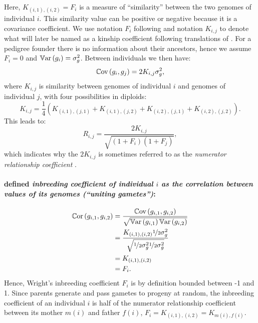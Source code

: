 %
Here, $K_{(i,1),(i,2)} = F_i$ is a measure of ``similarity'' between the
two genomes of individual $i$.
%
This similarity value can be positive or negative because it is a covariance
coefficient.
%
We use notation $F_i$ following \cite{wright1922coefficients} and
notation $K_{i,j}$ to denote what will later be named as a kinship
coefficient following translations of
\cite{malecot1948mathematiques, malecot1969mathemathics}.
%
For a pedigree founder there is no information about their ancestors,
hence we assume $F_i=0$ and $\mathbb{V}\text{ar}\left(g_i\right) = \sigma_g^2$.
%
Between individuals we then have:
%
\begin{equation} \label{eqn:g_pair_cov}
  \mathbb{C}\text{ov}\left(g_i, g_j\right)=2K_{i,j}\sigma_g^2,
\end{equation}
%
where $K_{i,j}$ is similarity between genomes of individual $i$ and
genomes of individual $j$, with four possibilities in diploids:
%
\begin{equation}
  K_{i,j} = \frac{1}{4}\left(
    K_{(i,1), (j,1)} +
    K_{(i,1), (j,2)} +
    K_{(i,2), (j,1)} +
    K_{(i,2), (j,2)}\right).\label{eqn:kinship_pair}
\end{equation}
%
This leads to:
%
\begin{equation}
  R_{i,j} = \frac{2K_{i,j}}
                 {\sqrt{\left(1 + F_i\right)\left(1 + F_j\right)}},
  \label{eqn:wright_relationship_K}
\end{equation}
%
which indicates why the $2K_{i,j}$ is sometimes referred to as
the \textit{numerator relationship coefficient} \citep{henderson1976simple}.

\paragraph{\cite{wright1922coefficients} defined
\textit{inbreeding coefficient of individual $i$ as the correlation
between values of its genomes (``uniting gametes'')}:}
%
\begin{align} \label{eqn:wright_inbreeding}
  \mathbb{C}\text{or}\left(g_{i,1}, g_{i,2}\right) & = \frac{\mathbb{C}\text{ov}\left(g_{i,1}, g_{i,2}\right)}
                                             {\sqrt{\mathbb{V}\text{ar}\left(g_{i,1}\right) \mathbb{V}\text{ar}\left(g_{i,2}\right)}} \\
                                    & = \frac{K_{(i,1),(i,2)}\nicefrac{1}{2}\sigma_g^2}
                                             {\sqrt{\nicefrac{1}{2}\sigma_g^2 \nicefrac{1}{2}\sigma_g^2}} \notag \\
                                    & = K_{(i,1),(i,2)} \notag \\
                                    & = F_i. \notag
\end{align}
%
Hence, Wright's inbreeding coefficient $F_i$ is by definition bounded
between -1 and 1.
%
Since parents generate and pass gametes to progeny at random, 
the inbreeding coefficient of an individual $i$ is
half of the numerator relationship coefficient between its mother $m(i)$ and
father $f(i)$, $F_i=K_{(i,1),(i,2)}=K_{m(i),f(i)}$.

